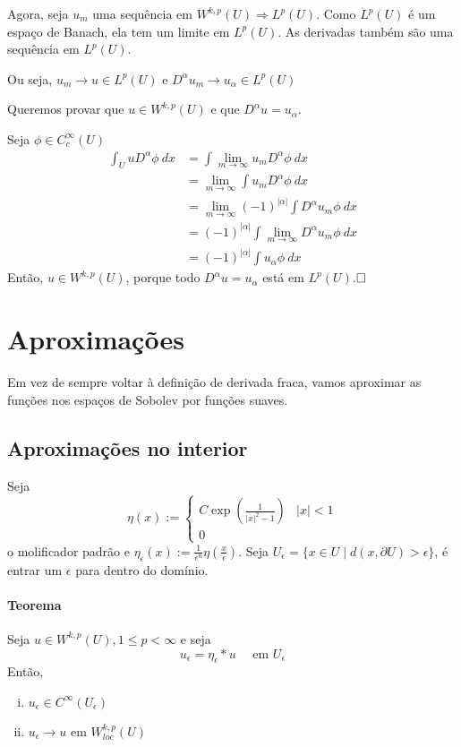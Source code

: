 \documentclass[11pt]{article}
\newcommand{\qed}{$\hfill\square$}
\newcommand{\p}{\partial}
\newcommand{\e}{\epsilon}
\begin{document}
Agora, seja \( u_m \) uma sequência em \( W^{k,p}(U)\Rightarrow L^p(U) \). Como \( L^p(U) \) é um espaço de Banach, ela tem um limite em \( L^p(U) \). As derivadas também são uma sequência em \( L^p(U) \).

Ou seja, \( u_m \rightarrow u \in L^p(U) \) e \( D^\alpha u_m \rightarrow u_{\alpha} \in L^p(U) \)

Queremos provar que \( u \in W^{k,p}(U) \) e que \( D^\alpha u = u_\alpha \).

Seja \( \phi \in C^\infty_c(U) \)
\begin{align*}
	\int_U u D^\alpha \phi\ dx &= \int \lim_{m \rightarrow \infty} u_m D^\alpha \phi \ dx	\\
	&= \lim_{m \rightarrow \infty} \int  u_m D^\alpha \phi \ dx	\\
	&= \lim_{m \rightarrow \infty} (-1)^{|\alpha| }\int D^\alpha  u_m \phi \ dx\\
	&= (-1)^{|\alpha| }\int  \lim_{m \rightarrow \infty} D^\alpha  u_m \phi \ dx		\\
	&= (-1)^{|\alpha| }\int  u_\alpha \phi \ dx
\end{align*}
Então, \( u \in W^{k,p}(U) \), porque todo \( D^\alpha u = u_\alpha \) está em \( L^p(U) \).\qed







\section{Aproximações}

Em vez de sempre voltar à definição de derivada fraca, vamos aproximar as funções nos espaços de Sobolev por funções suaves.

\subsection{Aproximações no interior}

Seja \[ \eta(x):= \begin{cases}
	C \exp\left(\frac{1}{|x|^2-1}\right) & |x|<1\\
	0
\end{cases} \] o molificador padrão e \( \eta_\e(x):= \frac{1}{\e^n}\eta\left(\frac{x}{\e}\right) \). Seja \( U_\e = \{x \in U \mid d(x, \p U) > \e\} \), é entrar um \( \e \) para dentro do domínio.

\paragraph{Teorema} Seja \( u \in W^{k,p}(U), 1 \leq p < \infty \) e seja \[ u_\e = \eta_\e * u\quad  \text{ em } U_\e\] Então, \begin{enumerate}[(i)]
	\item \( u_\e \in C^\infty(U_\e) \)
	\item \( u_\e \rightarrow u \) em \( W^{k,p}_{loc}(U) \)
\end{enumerate}
\end{document}
